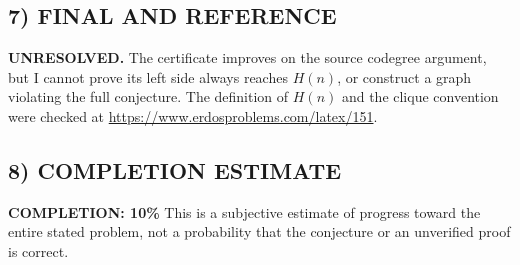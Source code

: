 \subsection*{7) FINAL AND REFERENCE}
\textbf{UNRESOLVED.} The certificate improves on the source codegree argument,
but I cannot prove its left side always reaches $H(n)$, or construct a
graph violating the full conjecture. The definition of $H(n)$ and the
clique convention were checked at
\url{https://www.erdosproblems.com/latex/151}.

\subsection*{8) COMPLETION ESTIMATE}
\textbf{COMPLETION: 10\%}
This is a subjective estimate of progress toward the entire stated problem, not a probability that the conjecture or an unverified proof is correct.
